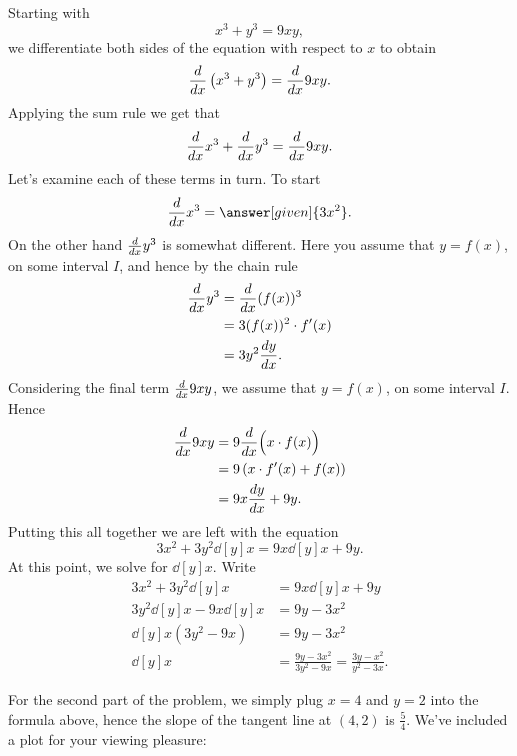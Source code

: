 \documentclass{ximera}
\begin{document}
\begin{example}
\begin{explanation}
Starting with
\[
x^3+y^3 = 9xy,
\]
we differentiate both sides of the
equation with respect to $x$ to obtain
\[
\ddx \left(x^3+y^3\right) = \ddx 9xy.
\]
Applying the sum rule we get that
\[
\ddx x^3+\ddx y^3 = \ddx 9xy.
\]
Let's examine each of these terms in turn. To start
\[
\ddx x^3 = \answer[given]{3x^2}.
\]
On the other hand $\ddx y^3$ is somewhat different. Here you assume that $y = f(x)$, on some interval $I$, and hence by the chain rule
\begin{align*}
\ddx y^3 &= \ddx (f(x))^3 \\
&= 3(f(x))^2 \cdot f'(x) \\
&= 3y^2\dd[y]{x}.
\end{align*}
Considering the final term $\ddx 9xy$, we assume that $y=f(x)$, on some interval $I$. Hence
\begin{align*}
\ddx 9xy &= 9\ddx \Bigl(x\cdot f(x)\Bigr) \\
&= 9 \left(x\cdot f'(x) + f(x)\right)\\
&= 9x \dd[y]{x} + 9y.
\end{align*}
Putting this all together we are left with the equation
\[
3x^2 + 3y^2\dd[y]{x} =9x \dd[y]{x} + 9y.
\]
At this point, we solve for $\dd[y]{x}$. Write
\begin{align*}
3x^2 + 3y^2\dd[y]{x} &= 9x \dd[y]{x} + 9y\\
3y^2\dd[y]{x} -  9x \dd[y]{x} &= 9y - 3x^2\\
\dd[y]{x}\left(3y^2-9x\right)&= 9y - 3x^2\\
\dd[y]{x} &=\frac{9y - 3x^2}{3y^2-9x} = \frac{3y - x^2}{y^2-3x}.
\end{align*}

For the second part of the problem, we simply plug $x=4$ and $y=2$
into the formula above, hence the slope of the tangent line at $(4,2)$
is $\frac{5}{4}$. We've included a plot for your viewing pleasure:
\begin{image}
\end{image}
\end{explanation}
\end{example}
\end{document}
